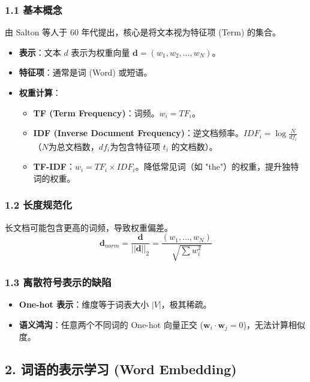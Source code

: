 \documentclass[a4paper, 11pt]{ctexart}
\begin{document}
\subsubsection{1.1 基本概念}
由 Salton 等人于 60 年代提出，核心是将文本视为特征项 (Term) 的集合。
\begin{itemize}
    \item \textbf{表示}：文本 $d$ 表示为权重向量 $\mathbf{d} = (w_1, w_2, \dots, w_N)$。
    \item \textbf{特征项}：通常是词 (Word) 或短语。
    \item \textbf{权重计算}：
    \begin{itemize}
        \item \textbf{TF (Term Frequency)}：词频。$w_i = TF_i$。
        \item \textbf{IDF (Inverse Document Frequency)}：逆文档频率。$IDF_i = \log \frac{N}{df_i}$ （$N$为总文档数，$df_i$为包含特征项 $t_i$ 的文档数）。
        \item \textbf{TF-IDF}：$w_i = TF_i \times IDF_i$。降低常见词（如 "the"）的权重，提升独特词的权重。
    \end{itemize}
\end{itemize}

\subsubsection{1.2 长度规范化}
长文档可能包含更高的词频，导致权重偏差。
\begin{equation}
    \mathbf{d}_{norm} = \frac{\mathbf{d}}{||\mathbf{d}||_2} = \frac{(w_1, \dots, w_N)}{\sqrt{\sum w_i^2}}
\end{equation}

\subsubsection{1.3 离散符号表示的缺陷}
\begin{itemize}
    \item \textbf{One-hot 表示}：维度等于词表大小 $|V|$，极其稀疏。
    \item \textbf{语义鸿沟}：任意两个不同词的 One-hot 向量正交 ($\mathbf{w}_i \cdot \mathbf{w}_j = 0$)，无法计算相似度。
\end{itemize}

\subsection{2. 词语的表示学习 (Word Embedding)}
\end{document}
